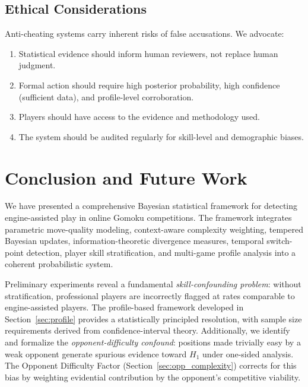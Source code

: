 \documentclass[11pt,a4paper]{article}
\begin{document}
\subsection{Ethical Considerations}

Anti-cheating systems carry inherent risks of false accusations. We advocate:
\begin{enumerate}
    \item Statistical evidence should inform human reviewers, not replace
          human judgment.
    \item Formal action should require high posterior probability, high
          confidence (sufficient data), and profile-level corroboration.
    \item Players should have access to the evidence and methodology used.
    \item The system should be audited regularly for skill-level and
          demographic biases.
\end{enumerate}


\section{Conclusion and Future Work}
\label{sec:conclusion}

We have presented a comprehensive Bayesian statistical framework for detecting
engine-assisted play in online Gomoku competitions. The framework integrates
parametric move-quality modeling, context-aware complexity weighting, tempered
Bayesian updates, information-theoretic divergence measures, temporal
switch-point detection, player skill stratification, and multi-game profile
analysis into a coherent probabilistic system.

Preliminary experiments reveal a fundamental \emph{skill-confounding problem}:
without stratification, professional players are incorrectly flagged at rates
comparable to engine-assisted players. The profile-based framework developed
in Section~\ref{sec:profile} provides a statistically principled resolution,
with sample size requirements derived from confidence-interval theory.
Additionally, we identify and formalize the \emph{opponent-difficulty confound}:
positions made trivially easy by a weak opponent generate spurious evidence
toward $H_1$ under one-sided analysis. The Opponent Difficulty Factor
(Section~\ref{sec:opp_complexity}) corrects for this bias by weighting
evidential contribution by the opponent's competitive viability.
\end{document}
